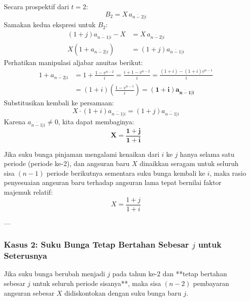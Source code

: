 \documentclass[11pt,a4paper]{article}
\begin{document}
Secara prospektif dari $t=2$:
\begin{equation}
    B_2 = X \, a_{\overline{n-2}|i}
\end{equation}
Samakan kedua ekspresi untuk $B_2$:
\begin{align*}
    (1+j) a_{\overline{n-1}|i} - X &= X \, a_{\overline{n-2}|i} \\
    X \left( 1 + a_{\overline{n-2}|i} \right) &= (1+j) a_{\overline{n-1}|i}
\end{align*}
Perhatikan manipulasi aljabar anuitas berikut:
\begin{align*}
    1 + a_{\overline{n-2}|i} &= 1 + \frac{1 - v^{n-2}}{i} = \frac{i + 1 - v^{n-2}}{i} = \frac{(1+i) - (1+i)v^{n-1}}{i} \\
    &= (1+i) \left( \frac{1 - v^{n-1}}{i} \right) = \mathbf{(1+i) a_{\overline{n-1}|i}}
\end{align*}
Substitusikan kembali ke persamaan:
\begin{equation*}
    X \cdot (1+i) a_{\overline{n-1}|i} = (1+j) a_{\overline{n-1}|i}
\end{equation*}
Karena $a_{\overline{n-1}|i} \neq 0$, kita dapat membaginya:
\begin{equation}
    \mathbf{X = \frac{1+j}{1+i}}
\end{equation}

\begin{theorembox}
Jika suku bunga pinjaman mengalami kenaikan dari $i$ ke $j$ hanya selama satu periode (periode ke-2), dan angsuran baru $X$ dinaikkan seragam untuk seluruh sisa $(n-1)$ periode berikutnya sementara suku bunga kembali ke $i$, maka rasio penyesuaian angsuran baru terhadap angsuran lama tepat bernilai faktor majemuk relatif:
\begin{equation*}
    X = \frac{1+j}{1+i}
\end{equation*}
\end{theorembox}

---

\subsubsection{Kasus 2: Suku Bunga Tetap Bertahan Sebesar \texorpdfstring{$j$}{j} untuk Seterusnya}

Jika suku bunga berubah menjadi $j$ pada tahun ke-2 dan **tetap bertahan sebesar $j$ untuk seluruh periode sisanya**, maka sisa $(n-2)$ pembayaran angsuran sebesar $X$ didiskontokan dengan suku bunga baru $j$.
\end{document}
